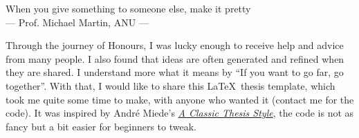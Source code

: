 \thispagestyle{empty}

\vspace*{3cm}

\begin{center}
When you give something to someone else, make it pretty \\ \medskip
--- Prof. Michael Martin, ANU ---   

\end{center}

\vspace{2cm}

Through the journey of Honours, I was lucky enough to receive help and advice from many people. I also found that ideas are often generated and refined when they are shared. I understand more what it means by ``If you want to go far, go together''. With that, I would like to share this \LaTeX\ thesis template, which took me quite some time to make, with anyone who wanted it (contact me for the code). It was inspired by André Miede's \href{https://bitbucket.org/amiede/classicthesis/wiki/Home}{\textit{A Classic Thesis Style}}, the code is not as fancy but a bit easier for beginners to tweak.